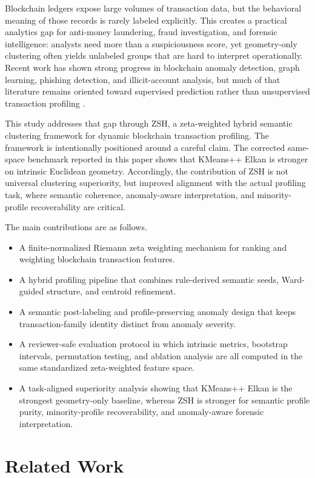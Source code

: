 \documentclass{ieeeaccess}
\begin{document}
Blockchain ledgers expose large volumes of transaction data, but the behavioral meaning of those records is rarely labeled explicitly. This creates a practical analytics gap for anti-money laundering, fraud investigation, and forensic intelligence: analysts need more than a suspiciousness score, yet geometry-only clustering often yields unlabeled groups that are hard to interpret operationally. Recent work has shown strong progress in blockchain anomaly detection, graph learning, phishing detection, and illicit-account analysis, but much of that literature remains oriented toward supervised prediction rather than unsupervised transaction profiling \cite{ref1,ref2,ref3,ref19,ref27,ref35}.

This study addresses that gap through ZSH, a zeta-weighted hybrid semantic clustering framework for dynamic blockchain transaction profiling. The framework is intentionally positioned around a careful claim. The corrected same-space benchmark reported in this paper shows that KMeans++ Elkan is stronger on intrinsic Euclidean geometry. Accordingly, the contribution of ZSH is not universal clustering superiority, but improved alignment with the actual profiling task, where semantic coherence, anomaly-aware interpretation, and minority-profile recoverability are critical.

The main contributions are as follows.
\begin{itemize}
\item A finite-normalized Riemann zeta weighting mechanism for ranking and weighting blockchain transaction features.
\item A hybrid profiling pipeline that combines rule-derived semantic seeds, Ward-guided structure, and centroid refinement.
\item A semantic post-labeling and profile-preserving anomaly design that keeps transaction-family identity distinct from anomaly severity.
\item A reviewer-safe evaluation protocol in which intrinsic metrics, bootstrap intervals, permutation testing, and ablation analysis are all computed in the same standardized zeta-weighted feature space.
\item A task-aligned superiority analysis showing that KMeans++ Elkan is the strongest geometry-only baseline, whereas ZSH is stronger for semantic profile purity, minority-profile recoverability, and anomaly-aware forensic interpretation.
\end{itemize}

\section{Related Work}
\end{document}
